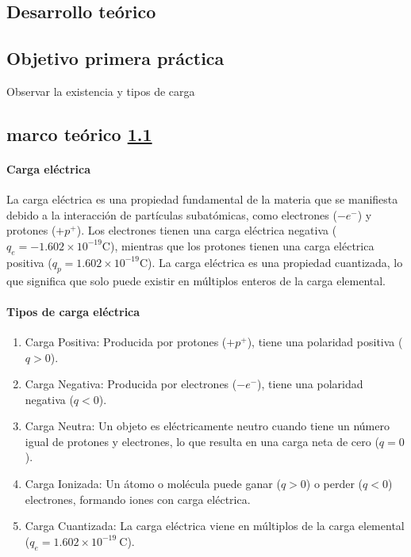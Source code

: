 \documentclass{article}
\begin{document}

\begin{multicols}{2}

\section{Desarrollo teórico}\label{Desarrollo Teorico}                              	%
\subsection{Objetivo primera práctica}\label{Objetivo primera práctica}
	Observar la existencia y tipos de carga
	\subsection{marco teórico \ref{Objetivo primera práctica}}
	\paragraph*{Carga eléctrica}
	La carga eléctrica es una propiedad fundamental de la materia que se manifiesta debido 
	a la interacción de partículas subatómicas, como electrones (\ensuremath{-e^{-}}) y protones 
	(\ensuremath{+p^{+}}). Los electrones tienen una carga eléctrica negativa
	(\ensuremath{q_{e}=-1.602\times 10^{-19}\mathrm{C}}), mientras que los protones
	tienen una carga eléctrica positiva (\ensuremath{q_{p}=1.602\times 10^{-19}\mathrm{C}}).
	La carga eléctrica es una propiedad cuantizada, lo que significa que solo puede existir 
	en múltiplos enteros de la carga elemental.

	\paragraph*{Tipos de carga eléctrica}
\begin{enumerate}
\item Carga Positiva: Producida por protones (\ensuremath{+p^{+}}), tiene una polaridad positiva (\ensuremath{q>0}).
\item Carga Negativa: Producida por electrones (\ensuremath{-e^{-}}), tiene una polaridad negativa (\ensuremath{q<0}).
\item Carga Neutra: Un objeto es eléctricamente neutro cuando tiene un número igual de protones y electrones, lo que resulta en una carga neta de cero (\ensuremath{q=0}).
\item Carga Ionizada: Un átomo o molécula puede ganar (\ensuremath{q>0}) o perder (\ensuremath{q<0}) electrones, formando iones con carga eléctrica.
\item Carga Cuantizada: La carga eléctrica viene en múltiplos de la carga elemental (\ensuremath{q_{e}=1.602\times 10^{-19}~\mathrm{C}}).
\end{enumerate}

\end{multicols}
\end{document}
